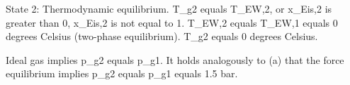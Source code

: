 State 2: Thermodynamic equilibrium.  
T_g2 equals T_EW,2, or x_Eis,2 is greater than 0, x_Eis,2 is not equal to 1.  
T_EW,2 equals T_EW,1 equals 0 degrees Celsius (two-phase equilibrium).  
T_g2 equals 0 degrees Celsius.  

Ideal gas implies p_g2 equals p_g1.  
It holds analogously to (a) that the force equilibrium implies p_g2 equals p_g1 equals 1.5 bar.
